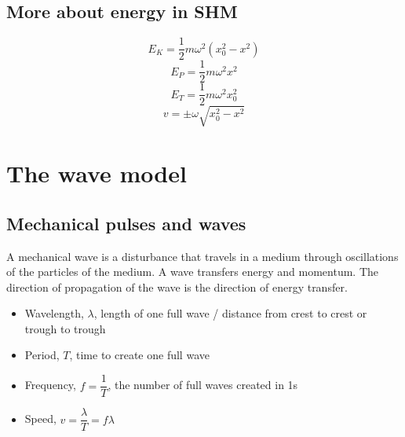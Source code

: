 \documentclass[a4paper,12pt]{article}
\begin{document}
\subsection{More about energy in SHM}
\[E_K=\dfrac{1}{2}m\omega^2(x_0^2-x^2)\]
\[E_P=\dfrac{1}{2}m\omega^2x^2\]
\[E_T=\dfrac{1}{2}m\omega^2x_0^2\]
\[v=\pm \omega\sqrt{x_0^2-x^2}\]
\section{The wave model}
\subsection{Mechanical pulses and waves}
A mechanical wave is a disturbance that travels in a medium through oscillations of the particles of the medium. A wave transfers energy and momentum. The direction of propagation of the wave is the direction of energy transfer.
\begin{itemize}
  \item Wavelength, $\lambda$, length of one full wave / distance from crest to crest or trough to trough
  \item Period, $T$, time to create one full wave
  \item Frequency, $f=\dfrac{1}{T}$, the number of full waves created in 1s
  \item Speed, $v=\dfrac{\lambda}{T}=f\lambda$
\end{itemize}
\end{document}
